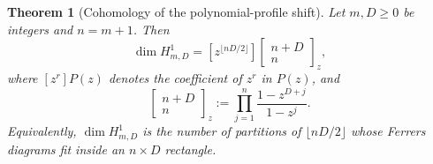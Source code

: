 \documentclass[11pt]{amsart}
\theoremstyle{plain}
\newtheorem{theorem}{Theorem}[section]
\theoremstyle{definition}
\theoremstyle{remark}
\numberwithin{equation}{section}
\theoremstyle{plain}
\begin{document}
\begin{theorem}[Cohomology of the polynomial-profile shift]
	\label{thm:cohomology-dimension}
	Let $m,D\ge0$ be integers and $n=m+1$.  Then
	\begin{equation}\label{eq:profile-cohomology-dimension}
		\dim H^1_{m,D}
		=
		[z^{\lfloor nD/2\rfloor}]
		\begin{bmatrix}n+D\\ n\end{bmatrix}_z,
	\end{equation}
	where $[z^r]P(z)$ denotes the coefficient of $z^r$ in $P(z)$, and
	\begin{equation}\label{eq:gaussian-binomial-product}
		\begin{bmatrix}n+D\\ n\end{bmatrix}_z
		:=\prod_{j=1}^{n}\frac{1-z^{D+j}}{1-z^j}.
	\end{equation}
	Equivalently, $\dim H^1_{m,D}$ is the number of partitions of
	$\lfloor nD/2\rfloor$ whose Ferrers diagrams fit inside an $n\times D$
	rectangle.
\end{theorem}
\end{document}
